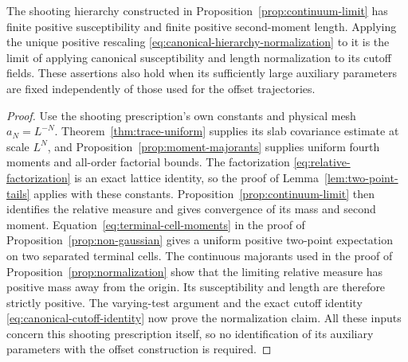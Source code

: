 \begin{lemma}
\label{lem:shooting-normalization}
The shooting hierarchy constructed in
Proposition~\ref{prop:continuum-limit} has finite positive susceptibility
and finite positive second-moment length.  Applying the unique positive
rescaling \eqref{eq:canonical-hierarchy-normalization} to it is the
limit of applying canonical susceptibility and length normalization to
its cutoff fields.  These assertions also hold when its sufficiently
large auxiliary parameters are fixed independently of those used for
the offset trajectories.
\end{lemma}

\begin{proof}
Use the shooting prescription's own constants and physical mesh
$a_N=L^{-N}$.  Theorem~\ref{thm:trace-uniform} supplies its slab
covariance estimate at scale $L^N$, and
Proposition~\ref{prop:moment-majorants} supplies uniform fourth moments
and all-order factorial bounds.  The factorization
\eqref{eq:relative-factorization} is an exact lattice identity, so the
proof of Lemma~\ref{lem:two-point-tails} applies with these constants.
Proposition~\ref{prop:continuum-limit} then identifies the relative
measure and gives convergence of its mass and second moment.
Equation~\eqref{eq:terminal-cell-moments} in the proof of
Proposition~\ref{prop:non-gaussian} gives a uniform positive two-point
expectation on two separated terminal cells.  The continuous majorants
used in the proof of Proposition~\ref{prop:normalization} show that the
limiting relative measure has positive mass away from the origin.
Its susceptibility and length are therefore strictly positive.
The varying-test argument and the exact cutoff identity
\eqref{eq:canonical-cutoff-identity} now prove the normalization claim.
All these inputs concern this shooting prescription itself, so no
identification of its auxiliary parameters with the offset construction
is required.
\end{proof}
